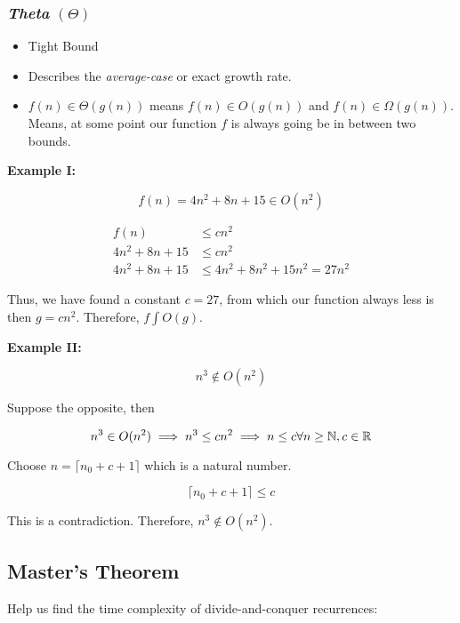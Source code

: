 \subsubsection{\emph{Theta} \texorpdfstring{\((\Theta)\)}{}} 

\begin{itemize}

    \item Tight Bound

    \item Describes the \emph{average-case} or exact growth rate.

    \item \(f(n) \in \Theta(g(n))\) means \(f(n) \in O(g(n))\) and \(f(n) \in \Omega(g(n))\). 
          Means,  at some point our function \(f\) is always going be in between two bounds.

\end{itemize}

\textbf{Example I:}

\[
    f(n) = 4n^2 + 8n + 15 \in O(n^2)
\]

\begin{align*}
    f(n) &\le c n^2 \\
    4n^2 + 8n + 15 &\le c n^2 \\
    4n^2 + 8n + 15 &\le 4n^2 + 8n^2 + 15n^2  = 27n^2
\end{align*}

Thus, we have found a constant \(c = 27\), from which our function always less is then \(g = c n^2\). 
Therefore, \(f \int O(g)\).

\QED

\textbf{Example II:}

\[
    n^3 \notin O(n^2)
\]

Suppose the opposite, then 

\[
    n^3 \in O(n^2) \implies n^3 \le c n^2 \implies n \le c \forall n \ge \mathbb{N}, c \in \mathbb{R}
\]

Choose \(n = \lceil n_0 + c + 1 \rceil\) which is a natural number.

\[
    \lceil n_0 + c + 1 \rceil \le c 
\]

This is a contradiction. Therefore, \(n^3 \notin O(n^2)\).

\QED

\subsection{Master's Theorem}

Help us find the time complexity of divide-and-conquer recurrences:  

